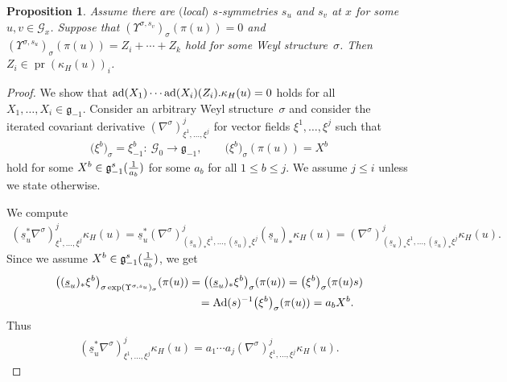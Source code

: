 \documentclass[pdftex]{sigma}
\newcommand{\ka}{\kappa}
\newcommand{\si}{\sigma}
\newcommand{\un}{\underline}
\newcommand{\ba}{\mathcal{G}}
\newcommand{\fg}{\mathfrak g}
\newcommand{\Ad}{{\rm Ad}}
\newcommand{\U}{\Upsilon}
\newcommand{\ad}{{\rm ad}}
\numberwithin{equation}{section}
\newtheorem{Proposition}[Theorem]{Proposition}
 { \theoremstyle{definition}
\newtheorem{Definition}[Theorem]{Definition}
\newtheorem{Example}[Theorem]{Example}
\newtheorem{Remark}[Theorem]{Remark} }
\begin{document}
\begin{Proposition} \label{cor-ws}
Assume there are $($local$)$ $s$-symmetries $s_u$ and $s_v$ at $x$ for some $u,v\in \ba_x$. Suppose that $(\U^{\si,s_v})_\si(\pi(u))=0$
and $(\U^{\si,s_u})_\si(\pi(u))=Z_i+\cdots+Z_k$ hold for some Weyl structu\-re~$\si$. Then $Z_i\in \operatorname{pr}(\kappa_H(u))_i$.
\end{Proposition}
\begin{proof}
We show that $\ad(X_1)\cdots \ad(X_i)(Z_i).\kappa_H(u)=0$ holds for all $X_1,\dots, X_i\in\fg_{-1}$. Consider an arbitrary Weyl structure~$\si$ and consider the iterated covariant derivative $(\nabla^\si)^j_{\xi^1,\dots,\xi^j}$ for vector f\/ields $\xi^1,\dots,\xi^j$ such that
\begin{gather*}\big(\xi^b\big)_\si=\xi^b_{-1}\colon \ \ba_0\to \fg_{-1},\qquad
\big(\xi^b\big)_\si(\pi(u))=X^b\end{gather*} hold for some $X^b\in \fg_{-1}^s( {1 \over a_b})$ for some $a_b$ for all $1\leq b \leq j$. We assume $j\leq i$ unless we state otherwise.

We compute
\begin{gather*}
(\un s_u^*\nabla^\si)^j_{\xi^1,\dots,\xi^j} \ka_H(u)= \un s_u^*(\nabla^\si)^j_{(\un s_u)_*\xi^1,\dots,(\un s_u)_*\xi^j}(\un s_u)_*\ka_H(u)
=(\nabla^\si)^j_{(\un s_u)_*\xi^1,\dots,(\un s_u)_*\xi^j}\ka_H(u).
\end{gather*}
Since we assume $X^b\in \fg_{-1}^s({1 \over a_b})$, we get
\begin{gather*}
\big((\un s_u)_*\xi^b\big)_{\si \exp(\U^{\si,s_u})_\si}(\pi(u))=\big((\un s_u)_*\xi^b\big)_{\si}(\pi(u))=\big(\xi^b\big)_\si(\pi(u)s)\\
\hphantom{\big((\un s_u)_*\xi^b\big)_{\si \exp(\U^{\si,s_u})_\si}(\pi(u))}{}=\Ad(s)^{-1}\big(\xi^b\big)_\si(\pi(u))=a_bX^b.
\end{gather*}
Thus
\begin{gather}\label{form-act}
(\un s_u^*\nabla^\si)^j_{\xi^1,\dots,\xi^j} \ka_H(u)=a_1\cdots a_j(\nabla^\si)^j_{\xi^1,\dots,\xi^j} \ka_H(u).
\end{gather}


\end{proof}
\end{document}
